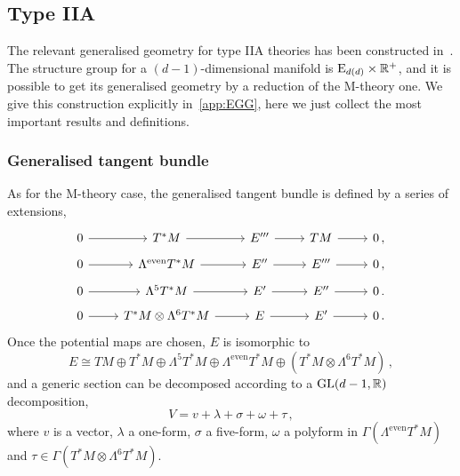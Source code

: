 \documentclass[debug]{phd}
\begin{document}
			\subsection{Type IIA}
				The relevant generalised geometry for type IIA theories has been constructed in~\cite{oscar1}.
				The structure group for a $(d-1)$-dimensional manifold is $\mathrm{E}_{d(d)} \times \mathbb{R}^+$, and it is possible to get its generalised geometry by a reduction of the M-theory one. 
				We give this construction explicitly in~\cref{app:EGG}, here we just collect the most important results and definitions.
				\subsubsection{Generalised tangent bundle}
					As for the M-theory case, the generalised tangent bundle is defined by a series of extensions,
							\begin{equation}\label{IIAexten}
								\begin{tikzcd}[row sep=tiny]
										0 \arrow{r} & T^*M \arrow{r} &E''' \arrow{r} &TM \arrow{r} &0 	\, , \\
										0 \arrow{r} &\Lambda^{\mathrm{even}} T^*M \arrow{r} &E'' \arrow{r} &E''' \arrow{r} &0 	\, , \\
										0 \arrow{r} &\Lambda^5 T^*M \arrow{r} &E' \arrow{r} &E'' \arrow{r} &0 \, . \\
										0 \arrow{r} &T^*M \otimes \Lambda^6 T^*M \arrow{r} &E \arrow{r} &E' \arrow{r} &0 \, .
									\end{tikzcd}
							\end{equation}
					Once the potential maps are chosen, $E$ is isomorphic to
							\begin{equation}\label{IIAtangbung}
								E \cong TM \oplus T^*M \oplus \Lambda^5 T^*M \oplus \Lambda^{\mathrm{even}} T^*M \oplus (T^*M \otimes \Lambda^6 T^*M)\, ,
							\end{equation}
					and a generic section can be decomposed according to a $\mathrm{GL}(d-1,\mathbb{R})$ decomposition,
							\begin{equation}\label{IIAgenV}
								V = v + \lambda + \sigma + \omega + \tau \, ,
							\end{equation}
					where $v$ is a vector, $\lambda$ a one-form, $\sigma$ a five-form, $\omega$ a polyform in $\Gamma(\Lambda^{\mathrm{even}}T^*M)$ and $\tau \in \Gamma(T^*M \otimes \Lambda^6 T^*M)$.
					
\end{document}
